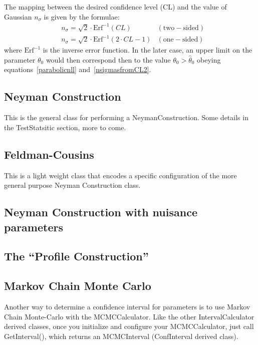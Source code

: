 \documentclass[11pt]{article}
\begin{document}
The mapping between the desired 
confidence level (CL) and the value of Gaussian $n_\sigma$ is given by the formulae:
\begin{eqnarray}
    \label{nsigmasfromCL1}
    &n_\sigma = \sqrt{2}\cdot \mathrm{Erf}^{-1}(CL) & \mathrm{(two-sided)} \\
    &n_\sigma = \sqrt{2}\cdot \mathrm{Erf}^{-1}(2 \cdot CL -1) & \mathrm{(one-sided)}
    \label{nsigmasfromCL2}
\end{eqnarray}
where $\mathrm{Erf}^{-1}$ is the inverse error function. In
the later case, an upper limit on the parameter $\theta_0$ would then
correspond then to the value $\theta_0>\hat{\theta}_0$ obeying
equations~\ref{parabolicnll} and~\ref{nsigmasfromCL2}.



	\subsection{Neyman Construction}

This is the general class for performing a NeymanConstruction.
Some details in the TestStatsitic section, more to come.

	\subsection{Feldman-Cousins}

This is a light weight class that encodes a specific configuration of the more general purpose  Neyman Construction class.

	\subsection{Neyman Construction with nuisance parameters}

	\subsection{The ``Profile Construction''}

	\subsection{Markov Chain Monte Carlo}

	Another way to determine a confidence interval for parameters is to use Markov Chain Monte-Carlo with the MCMCCalculator.  Like the other IntervalCalculator derived classes, once you initialize and configure your MCMCCalculator, just call GetInterval(), which returns an MCMCInterval (ConfInterval derived class).
	
\end{document}
